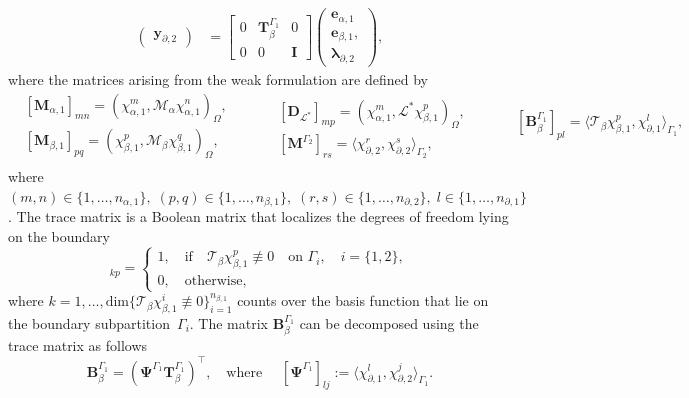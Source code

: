 \documentclass[11pt,a4paper]{article}
\newcommand{\innerproduct}[3][\Omega]{(#2, #3)_{#1}}
\newcommand{\boundary}[3][\partial\Omega]{\langle #2, #3\rangle_{#1}}
\begin{document}
{\begin{equation}
\begin{aligned}
\begin{pmatrix}
            \mathbf{y}_{\partial, 2}
        \end{pmatrix} &= \begin{bmatrix}
            0 & \mathbf{T}_\beta^{\Gamma_1} & 0 \\ 
            0 & 0 & \mathbf{I}
        \end{bmatrix} \begin{pmatrix}
            \mathbf{e}_{\alpha, 1} \\
            \mathbf{e}_{\beta, 1}, \\
            \bm{\lambda}_{\partial, 2}
        \end{pmatrix},
    \end{aligned}
\label{eq:systemL*}
\end{equation}
where the matrices arising from the weak formulation are defined by
\begin{equation}
\begin{aligned}
    &[\mathbf{M}_{\alpha, 1}]_{mn} =\innerproduct{\chi_{\alpha, 1}^m}{\mathcal{M}_\alpha \chi_{\alpha, 1}^n}, \\
    &[\mathbf{M}_{\beta, 1}]_{pq} = \innerproduct{\chi_{\beta, 1}^p}{\mathcal{M}_\beta \chi_{\beta, 1}^q}, \\
\end{aligned}\qquad
    \begin{aligned}
    &[\mathbf{D}_{\mathcal{L}^*}]_{mp} = \innerproduct{\chi_{\alpha, 1}^m}{\mathcal{L}^*\chi_{\beta, 1}^p}, \\
    &[\mathbf{M}^{\Gamma_2}]_{rs} = \boundary[\Gamma_2]{\chi_{\partial, 2}^r}{\chi_{\partial, 2}^s},
    \end{aligned} \qquad 
    \begin{aligned}
        &[\mathbf{B}_\beta^{\Gamma_1}]_{pl} = \boundary[\Gamma_1]{\mathcal{T}_\beta\chi_{\beta, 1}^p}{\chi_{\partial, 1}^l}, \\
        &{}
    \end{aligned}
\label{eq:Operational-matrices_1}
\end{equation}
where $(m,n) \in \{1, \dots, n_{\alpha, 1}\}, \; (p,q) \in\{1, \dots, n_{\beta, 1}\}, \; (r,s) \in \{1,\dots, n_{\partial, 2}\}, \; l \in \{1,\dots, n_{\partial, 1}\}$. The trace matrix is a Boolean matrix that localizes the degrees of freedom lying on the boundary
\begin{equation}
        [\mathbf{T}_{\beta}^{\Gamma_i}]_{kp} = \begin{cases}
            1,  \quad \text{if} \quad \mathcal{T}_\beta\chi_{\beta, 1}^p \not\equiv 0 \quad \text{on } \Gamma_i, \quad i=\{1,2\}, \\
            0,  \quad \text{otherwise},
        \end{cases}
\end{equation}
where $k=1, \dots, \mathrm{dim} \{\mathcal{T}_\beta\chi_{\beta, 1}^i  \not\equiv 0\}_{i=1}^{n_{\beta, 1}}$ counts over the basis function that lie on the boundary subpartition~$\Gamma_i$. The matrix $\mathbf{B}_\beta^{\Gamma_1}$ can be decomposed using the trace matrix as follows
$$
\mathbf{B}_\beta^{\Gamma_1} = (\bm{\Psi}^{\Gamma_1} \mathbf{T}_\beta^{\Gamma_1})^\top, \quad \text{where } \quad [\bm{\Psi}^{\Gamma_1}]_{lj}:= \boundary[\Gamma_1]{\chi_{\partial, 1}^l}{\chi_{\partial, 2}^j}.
$$
}
\end{document}
